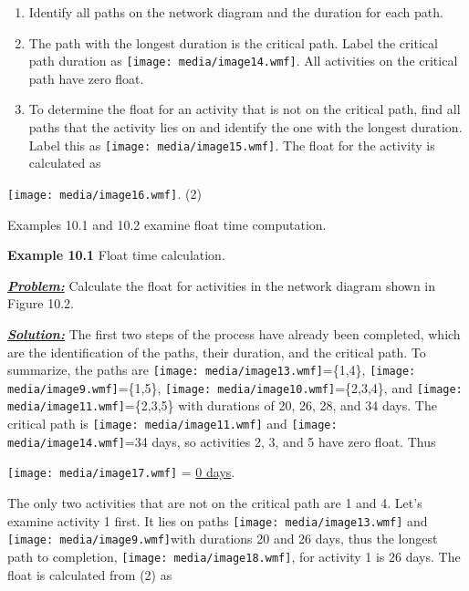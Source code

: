 \begin{enumerate}
\def\labelenumi{\arabic{enumi}.}
\item
  Identify all paths on the network diagram and the duration for each
  path.
\item
  The path with the longest duration is the critical path. Label the
  critical path duration as
  \texttt{[image: media/image14.wmf]}.
  All activities on the critical path have zero float.
\item
  To determine the float for an activity that is not on the critical
  path, find all paths that the activity lies on and identify the one
  with the longest duration. Label this as
  \texttt{[image: media/image15.wmf]}\emph{.} The float for the activity
  is calculated as
\end{enumerate}

\texttt{[image: media/image16.wmf]}\emph{.}
(2)

Examples 10.1 and 10.2 examine float time computation.

\textbf{Example 10.1} Float time calculation.

\emph{\textbf{\ul{Problem:}}} Calculate the float for activities in the
network diagram shown in Figure 10.2.

\emph{\textbf{\ul{Solution:}}} The first two steps of the process have
already been completed, which are the identification of the paths, their
duration, and the critical path. To summarize, the paths are
\texttt{[image: media/image13.wmf]}=\{1,4\},
\texttt{[image: media/image9.wmf]}=\{1,5\},
\texttt{[image: media/image10.wmf]}=\{2,3,4\},
and
\texttt{[image: media/image11.wmf]}=\{2,3,5\}
with durations of 20, 26, 28, and 34 days. The critical path is
\texttt{[image: media/image11.wmf]}
and
\texttt{[image: media/image14.wmf]}=34
days, so activities 2, 3, and 5 have zero float. Thus

\texttt{[image: media/image17.wmf]} =
\ul{0 days}.

The only two activities that are not on the critical path are 1 and 4.
Let's examine activity 1 first. It lies on paths
\texttt{[image: media/image13.wmf]}
and
\texttt{[image: media/image9.wmf]}with
durations 20 and 26 days, thus the longest path to completion,
\texttt{[image: media/image18.wmf]},
for activity 1 is 26 days. The float is calculated from (2) as

